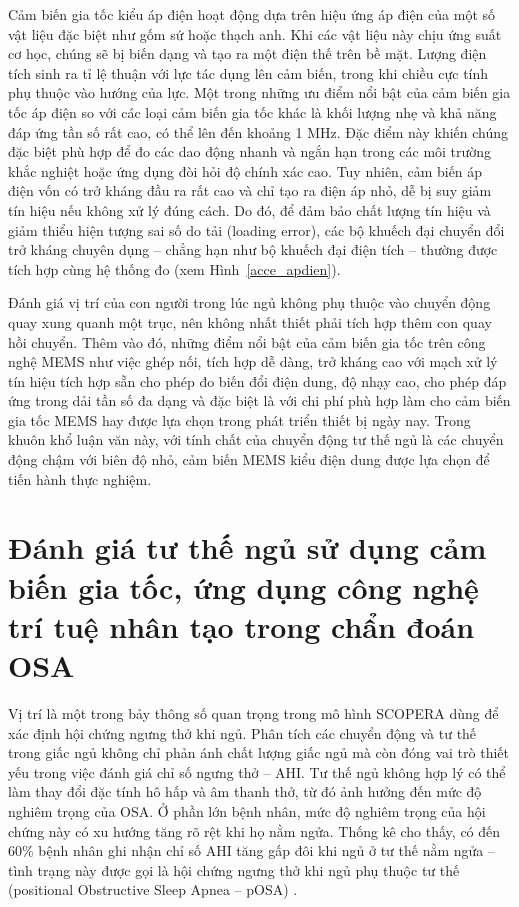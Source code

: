 Cảm biến gia tốc kiểu áp điện hoạt động dựa trên hiệu ứng áp điện của một số vật liệu đặc biệt như gốm sứ hoặc thạch anh. Khi các vật liệu này chịu ứng suất cơ học, chúng sẽ bị biến dạng và tạo ra một điện thế trên bề mặt. Lượng điện tích sinh ra tỉ lệ thuận với lực tác dụng lên cảm biến, trong khi chiều cực tính phụ thuộc vào hướng của lực. Một trong những ưu điểm nổi bật của cảm biến gia tốc áp điện so với các loại cảm biến gia tốc khác là khối lượng nhẹ và khả năng đáp ứng tần số rất cao, có thể lên đến khoảng 1 MHz. Đặc điểm này khiến chúng đặc biệt phù hợp để đo các dao động nhanh và ngắn hạn trong các môi trường khắc nghiệt hoặc ứng dụng đòi hỏi độ chính xác cao. Tuy nhiên, cảm biến áp điện vốn có trở kháng đầu ra rất cao và chỉ tạo ra điện áp nhỏ, dễ bị suy giảm tín hiệu nếu không xử lý đúng cách. Do đó, để đảm bảo chất lượng tín hiệu và giảm thiểu hiện tượng sai số do tải (loading error), các bộ khuếch đại chuyển đổi trở kháng chuyên dụng – chẳng hạn như bộ khuếch đại điện tích – thường được tích hợp cùng hệ thống đo (xem Hình~\ref{acce_apdien}).






Đánh giá vị trí của con người trong lúc ngủ không phụ thuộc vào chuyển động quay xung quanh một trục, nên không nhất thiết phải tích hợp thêm con quay hồi chuyển. Thêm vào đó, những điểm nổi bật của cảm biến gia tốc trên công nghệ MEMS như việc ghép nối, tích hợp dễ dàng, trở kháng cao với mạch xử lý tín hiệu tích hợp sẵn cho phép đo biến đổi điện dung, độ nhạy cao, cho phép đáp ứng trong dải tần số đa dạng và đặc biệt là với chi phí phù hợp làm cho cảm biến gia tốc MEMS hay được lựa chọn trong
phát triển thiết bị ngày nay. Trong khuôn khổ luận văn này, với tính chất của chuyển động tư thế ngủ là các chuyển động chậm với biên độ nhỏ, cảm biến MEMS kiểu điện dung được lựa chọn để tiến hành thực nghiệm.

\section{Đánh giá tư thế ngủ sử dụng cảm biến gia tốc, ứng dụng công nghệ trí tuệ nhân tạo trong chẩn đoán OSA}

Vị trí là một trong bảy thông số quan trọng trong mô hình SCOPERA dùng để xác định hội chứng ngưng thở khi ngủ. Phân tích các chuyển động và tư thế trong giấc ngủ không chỉ phản ánh chất lượng giấc ngủ mà còn đóng vai trò thiết yếu trong việc đánh giá chỉ số ngưng thở – AHI. Tư thế ngủ không hợp lý có thể làm thay đổi đặc tính hô hấp và âm thanh thở, từ đó ảnh hưởng đến mức độ nghiêm trọng của OSA. Ở phần lớn bệnh nhân, mức độ nghiêm trọng của hội chứng này có xu hướng tăng rõ rệt khi họ nằm ngửa. Thống kê cho thấy, có đến 60\% bệnh nhân ghi nhận chỉ số AHI tăng gấp đôi khi ngủ ở tư thế nằm ngửa – tình trạng này được gọi là hội chứng ngưng thở khi ngủ phụ thuộc tư thế (positional Obstructive Sleep Apnea – pOSA) \cite{Unat1391}.

